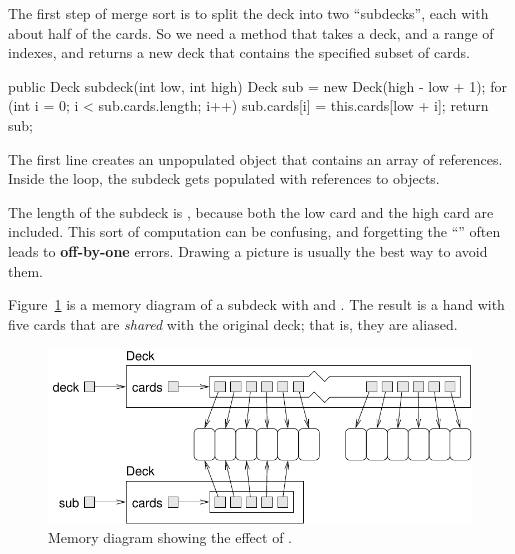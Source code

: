 \label{subdeck}

The first step of merge sort is to split the deck into two ``subdecks'', each with about half of the cards.
So we need a method that takes a deck, and a range of indexes, and returns a new deck that contains the specified subset of cards.

\begin{code}
public Deck subdeck(int low, int high) {
    Deck sub = new Deck(high - low + 1);
    for (int i = 0; i < sub.cards.length; i++) {
        sub.cards[i] = this.cards[low + i];
    }
    return sub;
}
\end{code}

The first line creates an unpopulated  object that contains an array of  references.
Inside the  loop, the subdeck gets populated with references to  objects.


The length of the subdeck is , because both the low card and the high card are included.
This sort of computation can be confusing, and forgetting the ``'' often leads to {\bf off-by-one} errors.
Drawing a picture is usually the best way to avoid them.

%


Figure~\ref{fig.subdeck} is a memory diagram of a subdeck with  and .
The result is a hand with five cards that are {\em shared} with the original deck; that is, they are aliased.

\begin{figure}[!ht]
\begin{center}
\includegraphics{figs/subdeck.pdf}
\caption{Memory diagram showing the effect of .}
\label{fig.subdeck}
\end{center}
\end{figure}

